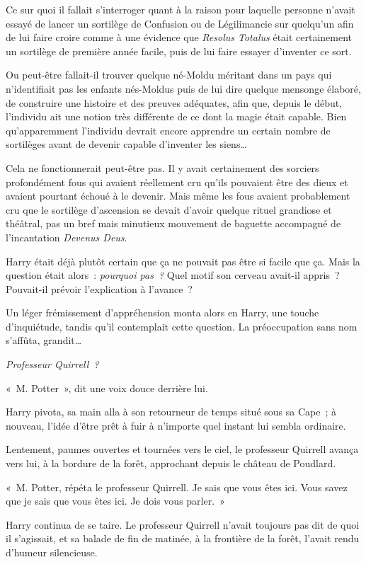 Ce sur quoi il fallait s'interroger quant à la raison pour laquelle personne n'avait essayé de lancer un sortilège de Confusion ou de Légilimancie sur quelqu'un afin de lui faire croire comme à une évidence que \emph{Resolus Totalus} était certainement un sortilège de première année facile, puis de lui faire essayer d'inventer ce sort.

Ou peut-être fallait-il trouver quelque né-Moldu méritant dans un pays qui n'identifiait pas les enfants nés-Moldus puis de lui dire quelque mensonge élaboré, de construire une histoire et des preuves adéquates, afin que, depuis le début, l'individu ait une notion très différente de ce dont la magie était capable.
Bien qu'apparemment l'individu devrait encore apprendre un certain nombre de sortilèges avant de devenir capable d'inventer les siens…

Cela ne fonctionnerait peut-être pas.
Il y avait certainement des sorciers profondément fous qui avaient réellement cru qu'ils pouvaient être des dieux et avaient pourtant échoué à le devenir.
Mais même les fous avaient probablement cru que le sortilège d'ascension se devait d'avoir quelque rituel grandiose et théâtral, pas un bref mais minutieux mouvement de baguette accompagné de l'incantation \emph{Devenus Deus}.

Harry était déjà plutôt certain que ça ne pouvait pas être si facile que ça.
Mais la question était alors~: \emph{pourquoi pas~?} Quel motif son cerveau avait-il appris~?
Pouvait-il prévoir l'explication à l'avance~?

Un léger frémissement d'appréhension monta alors en Harry, une touche d'inquiétude, tandis qu'il contemplait cette question.
La préoccupation sans nom s'affûta, grandit…

\emph{Professeur Quirrell~?}

«~M. Potter~», dit une voix douce derrière lui.

Harry pivota, sa main alla à son retourneur de temps situé sous sa Cape~; à nouveau, l'idée d'être prêt à fuir à n'importe quel instant lui sembla ordinaire.

Lentement, paumes ouvertes et tournées vers le ciel, le professeur Quirrell avança vers lui, à la bordure de la forêt, approchant depuis le château de Poudlard.

«~M. Potter, répéta le professeur Quirrell.
Je sais que vous êtes ici.
Vous savez que je sais que vous êtes ici.
Je dois vous parler.~»

Harry continua de se taire.
Le professeur Quirrell n'avait toujours pas dit de quoi il s'agissait, et sa balade de fin de matinée, à la frontière de la forêt, l'avait rendu d'humeur silencieuse.

